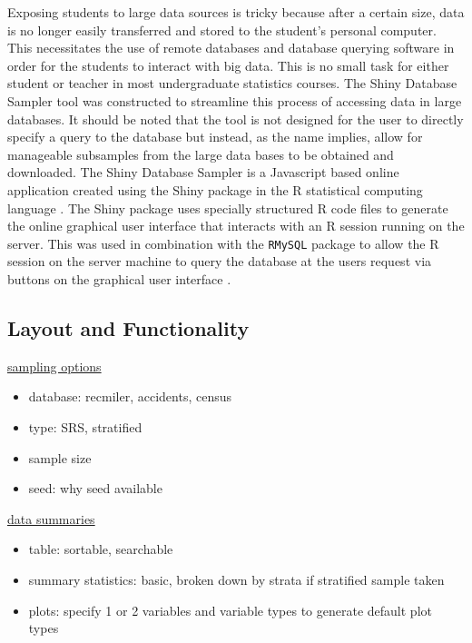 \documentclass{article}\usepackage[]{graphicx}\usepackage[]{color}
\begin{document}
 Exposing students to large data sources is tricky because after a certain size, data is no longer easily transferred and stored to the student's personal computer.  This necessitates the use of remote databases and database querying software in order for the students to interact with big data.  This is no small task for either student or teacher in most undergraduate statistics courses.  The Shiny Database Sampler tool was constructed to streamline this process of accessing data in large databases.  It should be noted that the tool is not designed for the user to directly specify a query to the database but instead, as the name implies, allow for manageable subsamples from the large data bases to be obtained and downloaded. 
The Shiny Database Sampler is a Javascript based online application created using the Shiny package in the R statistical computing language \citep{shiny}. The Shiny package uses specially structured R code files to generate the online graphical user interface that interacts with an R session running on the server.  This was used in combination with the \texttt{RMySQL} package to allow the R session on the server machine to query the database at the users request via buttons on the graphical user interface \citep{RMySQL}.  


\subsection{Layout and Functionality}

\underline{sampling options}
\begin{itemize}
\item database: recmiler, accidents, census
\item type: SRS, stratified
\item sample size
\item seed: why seed available
\end{itemize}

\vspace{.1in}

\underline{data summaries}
\begin{itemize}
\item table: sortable, searchable
\item summary statistics: basic, broken down by strata if stratified sample taken
\item plots: specify 1 or 2 variables and variable types to generate default plot types
\end{itemize}
\end{document}
